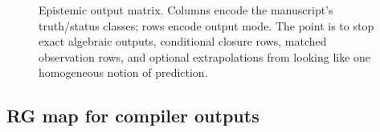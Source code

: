 \documentclass[11pt,a4paper]{article}
\theoremstyle{definition}
\theoremstyle{remark}
\begin{document}
\begin{figure}[t]
\caption{Epistemic output matrix. Columns encode the manuscript's truth/status classes; rows encode output mode. The point is to stop exact algebraic outputs, conditional closure rows, matched observation rows, and optional extrapolations from looking like one homogeneous notion of prediction.}
\label{fig:epistemic-output-matrix}
\end{figure}

\subsection{RG map for compiler outputs}
\label{sec:rg-map-compiler-outputs}
\end{document}
